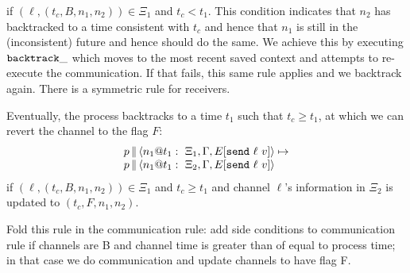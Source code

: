 \documentclass{article}
\begin{document}
\begin{itemize}
if $(\ell,(t_c,B,n_1,n_2)) \in \Xi_1$ and $t_c < t_1$. This condition
indicates that $n_2$ has backtracked to a time consistent with $t_c$ and
hence that $n_1$ is still in the (inconsistent) future and hence should do
the same. We achieve this by executing $\abacktrack$ which moves to the most
recent saved context and attempts to re-execute the communication.  If that
fails, this same rule applies and we backtrack again.  There is a symmetric
rule for receivers.

Eventually, the process backtracks to a time $t_1$ such that $t_c \geq t_1$,
at which we can revert the channel to the flag $F$:
\[\begin{array}{l}
  \parc{p}{\proc{n_1}{\Gamma}{\Xi_1}{E[\send{\ell}{v}]}{t_1}} \mapsto \\
  \parc{p}{\proc{n_1}{\Gamma}{\Xi_2}{E[\send{\ell}{v}]}{t_1}} 
\end{array}\]
if $(\ell,(t_c,B,n_1,n_2)) \in \Xi_1$ and $t_c \geq t_1$ and channel $\ell$'s
information in $\Xi_2$ is updated to $(t_c,F,n_1,n_2)$.

Fold this rule in the communication rule: add side conditions to
communication rule if channels are B and channel time is greater than of
equal to process time; in that case we do communication and update channels
to have flag F.

\end{itemize}

\end{document}
